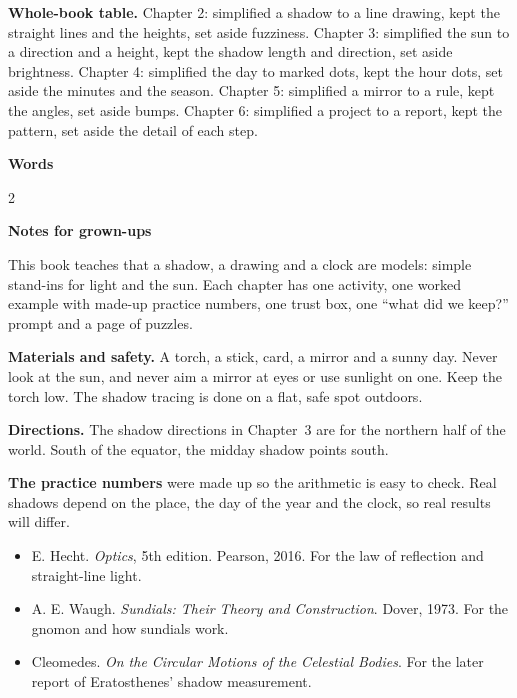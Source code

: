 \textbf{Whole-book table.} Chapter 2: simplified a shadow to a line drawing, kept the straight lines and the heights, set aside fuzziness. Chapter 3: simplified the sun to a direction and a height, kept the shadow length and direction, set aside brightness. Chapter 4: simplified the day to marked dots, kept the hour dots, set aside the minutes and the season. Chapter 5: simplified a mirror to a rule, kept the angles, set aside bumps. Chapter 6: simplified a project to a report, kept the pattern, set aside the detail of each step.

\clearpage\label{notes}
{\sans\bfseries\LARGE\color{ink} Words}\par
\small
\begin{multicols}{2}
\end{multicols}

\vspace{0.4em}
{\sans\bfseries\large\color{sky!70!black} Notes for grown-ups}\par
This book teaches that a shadow, a drawing and a clock are models: simple stand-ins for light and the sun. Each chapter has one activity, one worked example with made-up practice numbers, one trust box, one ``what did we keep?'' prompt and a page of puzzles.

\textbf{Materials and safety.} A torch, a stick, card, a mirror and a sunny day. Never look at the sun, and never aim a mirror at eyes or use sunlight on one. Keep the torch low. The shadow tracing is done on a flat, safe spot outdoors.

\textbf{Directions.} The shadow directions in Chapter~3 are for the northern half of the world. South of the equator, the midday shadow points south.

\textbf{The practice numbers} were made up so the arithmetic is easy to check. Real shadows depend on the place, the day of the year and the clock, so real results will differ.

\begin{itemize}[leftmargin=1.3em,itemsep=0.2em]
\item E. Hecht. \emph{Optics}, 5th edition. Pearson, 2016. For the law of reflection and straight-line light.
\item A. E. Waugh. \emph{Sundials: Their Theory and Construction}. Dover, 1973. For the gnomon and how sundials work.
\item Cleomedes. \emph{On the Circular Motions of the Celestial Bodies}. For the later report of Eratosthenes' shadow measurement.
\end{itemize}

